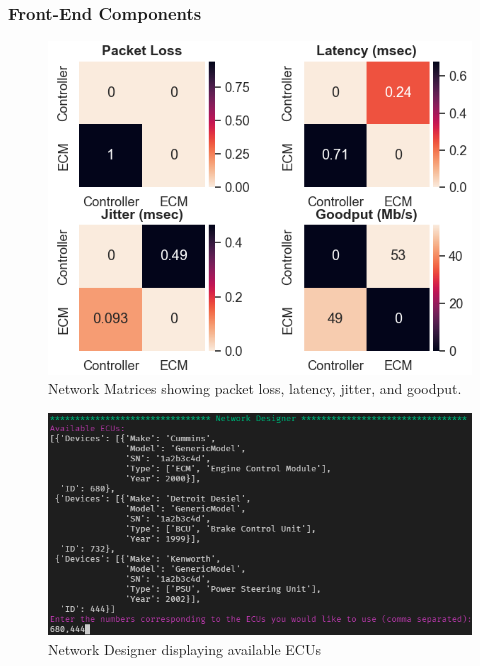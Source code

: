 \documentclass[letterpaper,twocolumn,12pt]{article}
\begin{document}
\subsubsection{Front-End Components}
\begin{figure}[]
    \centering
    \includegraphics[width=\linewidth]{images/network_matrix.png}
    \caption[]{Network Matrices showing packet loss, latency, jitter, and goodput.}
    \label{fig:network_matrix}
\end{figure}
\begin{figure}[]
    \centering
    \includegraphics[width=\linewidth]{images/network_designer.png}
    \caption[]{Network Designer displaying available ECUs\protect\footnotemark}
    \label{fig:network_designer}
\end{figure}
\end{document}
